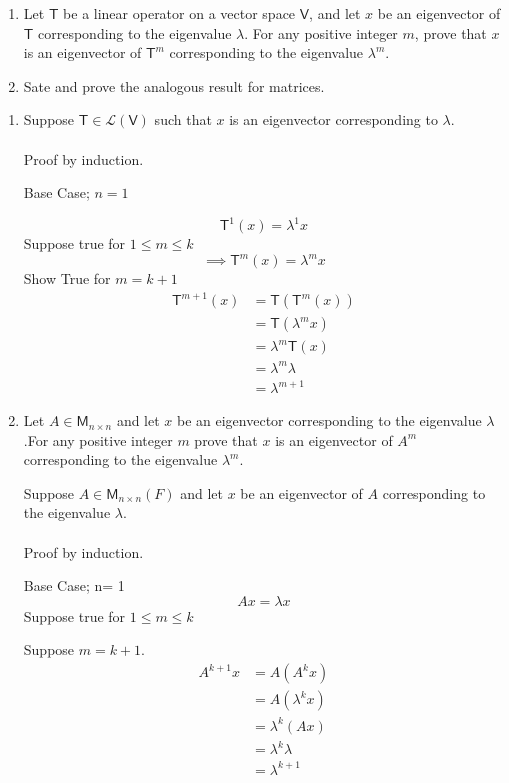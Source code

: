 \begin{enumerate}
\item
Let $\mathsf{T}$ be a linear operator on a vector space $\mathsf{V}$, and let $x$ be an
eigenvector of $\mathsf{T}$ corresponding to the eigenvalue
$\lambda$. For any positive integer $m$, prove that $x$ is an
eigenvector of $\mathsf{T}^m$ corresponding to the eigenvalue
$\lambda^m$.
\item Sate and prove the analogous result for matrices.
\end{enumerate}
\begin{enumerate}
\item Suppose  $\mathsf{T} \in \mathcal{L}(\mathsf{V})$ such that $x$
  is an eigenvector corresponding to $\lambda$.
\paragraph{}
Proof by induction.

Base Case; $n=1$

\begin{equation}
\mathsf{T}^1(x) = \lambda^1 x
\end{equation}
Suppose true for $1\leq m \leq k$ 
\begin{equation}
\implies \mathsf{T}^m(x) = \lambda^m x
\end{equation}
Show True for $m = k+1$ 
\begin{align}
\mathsf{T}^{m+1}(x) &= \mathsf{T}(\mathsf{T}^m(x))\\
&= \mathsf{T}(\lambda^m x)\\
&= \lambda^m\mathsf{T}(x)\\
&=\lambda^m \lambda\\
&= \lambda^{m+1}
\end{align}
\item Let $A \in \mathsf{M}_{n \times n}$ and let $x$ be an
  eigenvector corresponding to the eigenvalue $\lambda$ .For any
  positive integer $m$ prove that $x$ is an eigenvector of $A^m$
  corresponding to the eigenvalue $\lambda^m$.

Suppose $A \in \mathsf{M}_{n\times n}(F)$ and let $x$ be an
eigenvector of $A$ corresponding to the eigenvalue $\lambda$.
\paragraph{}
Proof by induction.

Base Case; n= 1
\begin{equation}
Ax = \lambda x
\end{equation}
Suppose true for $1 \leq m \leq k$

Suppose $m=k+1$.
\begin{align}
A^{k+1}x &= A(A^kx)\\
&= A(\lambda^k x)\\
&=\lambda^k(Ax)\\
&=\lambda^k\lambda\\
&=\lambda^{k+1}
\end{align}
\end{enumerate}
